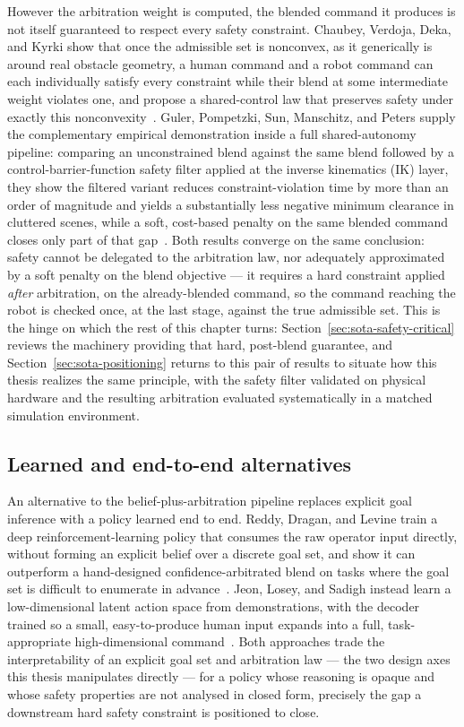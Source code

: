 \documentclass[12pt,a4paper,twoside,openright]{report}
\begin{document}
\label{sec:sota-linear-blending-limits}
However the arbitration weight is computed, the blended command it produces is not itself guaranteed to respect every safety constraint. Chaubey, Verdoja, Deka, and Kyrki show that once the admissible set is nonconvex, as it generically is around real obstacle geometry, a human command and a robot command can each individually satisfy every constraint while their blend at some intermediate weight violates one, and propose a shared-control law that preserves safety under exactly this nonconvexity~\cite{chaubey2026minimalintervention}. Guler, Pompetzki, Sun, Manschitz, and Peters supply the complementary empirical demonstration inside a full shared-autonomy pipeline: comparing an unconstrained blend against the same blend followed by a control-barrier-function safety filter applied at the inverse kinematics (IK) layer, they show the filtered variant reduces constraint-violation time by more than an order of magnitude and yields a substantially less negative minimum clearance in cluttered scenes, while a soft, cost-based penalty on the same blended command closes only part of that gap~\cite{guler2026barrierik}. Both results converge on the same conclusion: safety cannot be delegated to the arbitration law, nor adequately approximated by a soft penalty on the blend objective --- it requires a hard constraint applied \emph{after} arbitration, on the already-blended command, so the command reaching the robot is checked once, at the last stage, against the true admissible set. This is the hinge on which the rest of this chapter turns: Section~\ref{sec:sota-safety-critical} reviews the machinery providing that hard, post-blend guarantee, and Section~\ref{sec:sota-positioning} returns to this pair of results to situate how this thesis realizes the same principle, with the safety filter validated on physical hardware and the resulting arbitration evaluated systematically in a matched simulation environment.

\subsection{Learned and end-to-end alternatives}
\label{sec:sota-learned}

An alternative to the belief-plus-arbitration pipeline replaces explicit goal inference with a policy learned end to end. Reddy, Dragan, and Levine train a deep reinforcement-learning policy that consumes the raw operator input directly, without forming an explicit belief over a discrete goal set, and show it can outperform a hand-designed confidence-arbitrated blend on tasks where the goal set is difficult to enumerate in advance~\cite{reddy2018sharedrl}. Jeon, Losey, and Sadigh instead learn a low-dimensional latent action space from demonstrations, with the decoder trained so a small, easy-to-produce human input expands into a full, task-appropriate high-dimensional command~\cite{jeon2020latentactions}. Both approaches trade the interpretability of an explicit goal set and arbitration law --- the two design axes this thesis manipulates directly --- for a policy whose reasoning is opaque and whose safety properties are not analysed in closed form, precisely the gap a downstream hard safety constraint is positioned to close.
\end{document}
